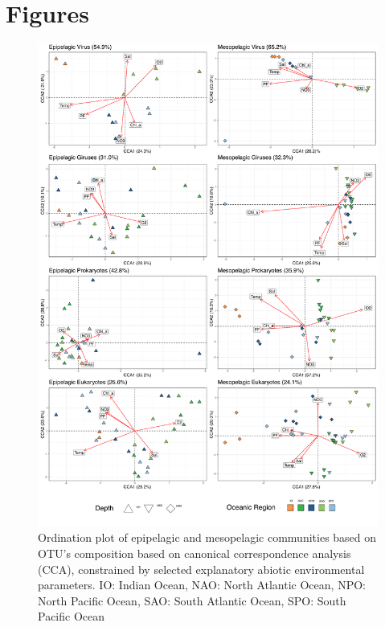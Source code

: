 \documentclass[fleqn,10pt]{wlscirep}
\begin{document}
\newpage
\section*{Figures}

\begin{figure}[ht]
    \centering
    \includegraphics[scale=0.28]{images/custom_cca_plot_hellinger_no_bathy_labels_OS_regions_colors_to_print.pdf}
    \caption{Ordination plot of epipelagic and mesopelagic communities based on OTU’s composition based on canonical correspondence analysis (CCA), constrained by selected explanatory abiotic environmental parameters. IO: Indian Ocean, NAO: North Atlantic Ocean, NPO: North Pacific Ocean, SAO: South Atlantic Ocean, SPO: South Pacific Ocean}
    \label{fig:cca_OS}
\end{figure}
\clearpage
\end{document}
